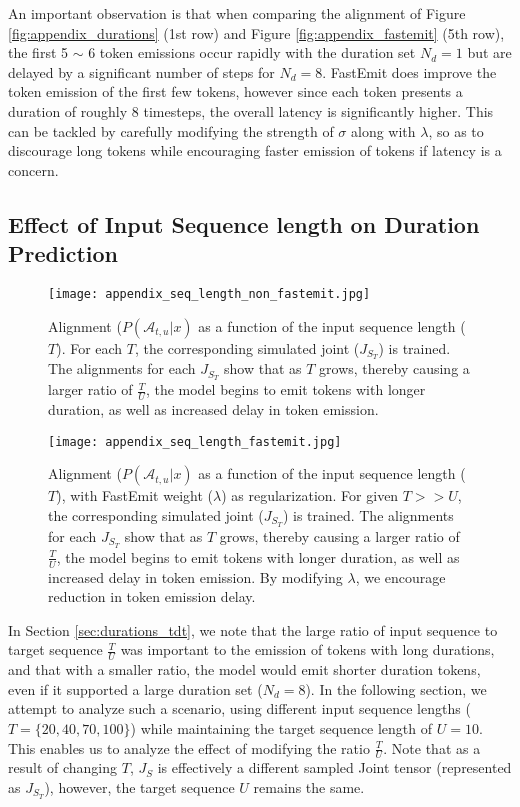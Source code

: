 \documentclass{article}
\begin{document}
An important observation is that when comparing the alignment of Figure \ref{fig:appendix_durations} (1st row) and Figure \ref{fig:appendix_fastemit} (5th row), the first 5 $\sim$ 6 token emissions occur rapidly with the duration set $N_d = 1$ but are delayed by a significant number of steps for $N_d = 8$. FastEmit does improve the token emission of the first few tokens, however since each token presents a duration of roughly 8 timesteps, the overall latency is significantly higher. This can be tackled by carefully modifying the strength of $\sigma$ along with $\lambda$, so as to discourage long tokens while encouraging faster emission of tokens if latency is a concern.

\subsection{Effect of Input Sequence length on Duration Prediction}
\label{sec:seq_len_tdt}

\begin{figure}[t]
    \centering
    \texttt{[image: appendix\_seq\_length\_non\_fastemit.jpg]}
    \caption{Alignment ($P(\mathcal{A}_{t, u} | x)$ as a function of the input sequence length ($T$). For each $T$, the corresponding simulated joint ($J_{S_T}$) is trained. The alignments for each $J_{S_T}$ show that as $T$ grows, thereby causing a larger ratio of $\frac{T}{U}$, the model begins to emit tokens with longer duration, as well as increased delay in token emission.}
    \label{fig:appendix_seq_len_non_fastemit}
\end{figure}
\begin{figure}[h!]
    \centering
    \texttt{[image: appendix\_seq\_length\_fastemit.jpg]}
    \caption{Alignment ($P(\mathcal{A}_{t, u} | x)$ as a function of the input sequence length ($T$), with FastEmit weight ($\lambda$) as regularization. For given $T >> U$, the corresponding simulated joint ($J_{S_T}$) is trained. The alignments for each $J_{S_T}$ show that as $T$ grows, thereby causing a larger ratio of $\frac{T}{U}$, the model begins to emit tokens with longer duration, as well as increased delay in token emission. By modifying $\lambda$, we encourage reduction in token emission delay.}
    \label{fig:appendix_seq_len_fastemit}
\end{figure}



In Section \ref{sec:durations_tdt}, we note that the large ratio of input sequence to target sequence $\frac{T}{U}$ was important to the emission of tokens with long durations, and that with a smaller ratio, the model would emit shorter duration tokens, even if it supported a large duration set ($N_d = 8$). In the following section, we attempt to analyze such a scenario, using different input sequence lengths ($T = \{ 20, 40, 70, 100 \}$) while maintaining the target sequence length of $U = 10$. This enables us to analyze the effect of modifying the ratio $\frac{T}{U}$. Note that as a result of changing $T$, $J_S$ is effectively a different sampled Joint tensor (represented as $J_{S_T}$), however, the target sequence $U$ remains the same.
\end{document}
